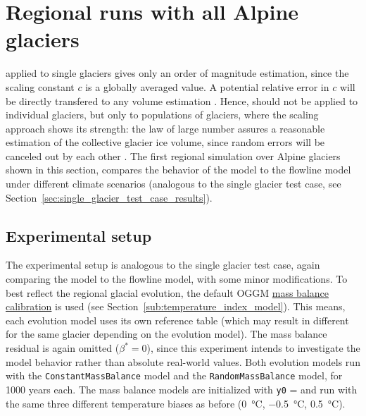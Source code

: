 

  \section{Regional runs with all Alpine glaciers} %
  \label{sec:regional_runs_with_all_alpine_glaciers_results}

    \Vas{} applied to single glaciers gives only an order of magnitude estimation, since the scaling constant $c$ is a globally averaged value. A potential relative error in $c$ will be directly transfered to any volume estimation \citep{Bahr2015}. Hence, \vas{} should not be applied to individual glaciers, but only to populations of glaciers, where the scaling approach shows its strength: the law of large number assures a reasonable estimation of the collective glacier ice volume, since random errors will be canceled out by each other \citep{Bahr2015}.
    The first regional simulation over Alpine glaciers shown in this section, compares the behavior of the \vas{} model to the flowline model under different climate scenarios (analogous to the single glacier test case, see Section~\ref{sec:single_glacier_test_case_results}).

    \subsection{Experimental setup} %
    \label{sub:experimental_setup_regional_run}

        The experimental setup is analogous to the single glacier test case, again comparing the \vas{} model to the flowline model, with some minor modifications. To best reflect the regional glacial evolution, the default OGGM \hyperref[ssub:mb_calib]{mass balance calibration} is used (see Section~\ref{sub:temperature_index_model}). This means, each evolution model uses its own \tstar{} reference table (which may result in different \tstar{} for the same glacier depending on the evolution model). The mass balance residual is again omitted ($\beta^* = 0$), since this experiment intends to investigate the model behavior rather than absolute real-world values.
        Both evolution models run with the \lstinline`ConstantMassBalance` model and the \lstinline`RandomMassBalance` model, for 1000 years each. The mass balance models are initialized with \lstinline`y0` = \tstar{} and run with the same three different temperature biases as before (\SI{0}{\celsius}, \SI{-0.5}{\celsius}, \SI{+0.5}{\celsius}).
    
